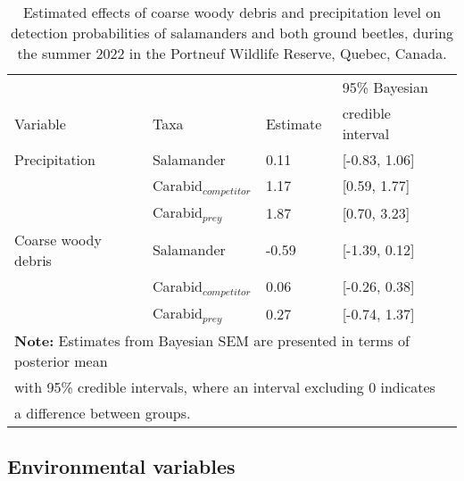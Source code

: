 \begin{table}[ht]
  \centering
  \caption[Estimated effects of coarse woody debris and precipitation level on detection probabilities of salamanders and both ground beetles.]
  {Estimated effects of coarse woody debris and precipitation level on detection probabilities of salamanders and both ground beetles, during the summer 2022 in the Portneuf Wildlife Reserve,  Quebec, Canada.}
  \label{tab:detection}
  \begin{tabular}{lllll} 
      \hline
      &&&95\% Bayesian \\
      Variable & Taxa & Estimate &  credible interval \\ [0.5ex] 
      \hline      
      Precipitation       & Salamander              & \hspace{1mm}0.11 & [-0.83, 1.06] \\ 
                          & Carabid$_{competitor}$  & \hspace{1mm}1.17 & [0.59, 1.77] \\ 
                          & Carabid$_{prey}$        & \hspace{1mm}1.87 & [0.70, 3.23] \\  
      \hline      
      Coarse woody debris & Salamander              & -0.59 & [-1.39, 0.12] \\ 
                          & Carabid$_{competitor}$  & \hspace{1mm}0.06 & [-0.26, 0.38] \\ 
                          & Carabid$_{prey}$        & \hspace{1mm}0.27 & [-0.74, 1.37] \\   

      \hline
      \multicolumn{4}{l}{\textbf{Note:} Estimates from Bayesian SEM are presented in terms of posterior mean} \\
      \multicolumn{4}{l}{with 95\% credible intervals, where an interval excluding 0 indicates} \\
      \multicolumn{4}{l}{a difference between groups.} \\
  \end{tabular}
\end{table}


\subsection*{Environmental variables}
\label{subsec:ResEnv}

